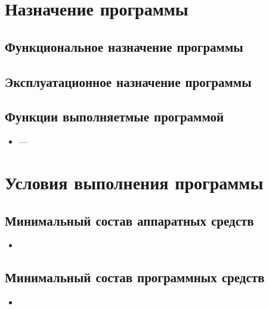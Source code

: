 \documentclass[allcolors=black]{article}
\begin{document}
\makeTitlePage

\tableofcontents

\section{Назначение программы}
\subsection{Функциональное назначение программы}

\subsection{Эксплуатационное назначение программы}

\subsection{Функции выполняетмые программой}
\begin{itemize}
    \item \textit{} --- 
\end{itemize}

\section{Условия выполнения программы}
\subsection{Минимальный состав аппаратных средств}
\begin{itemize}
    \item {}
\end{itemize}

\subsection{Минимальный состав программных средств}
\begin{itemize}
    \item {}
\end{itemize}
\end{document}
